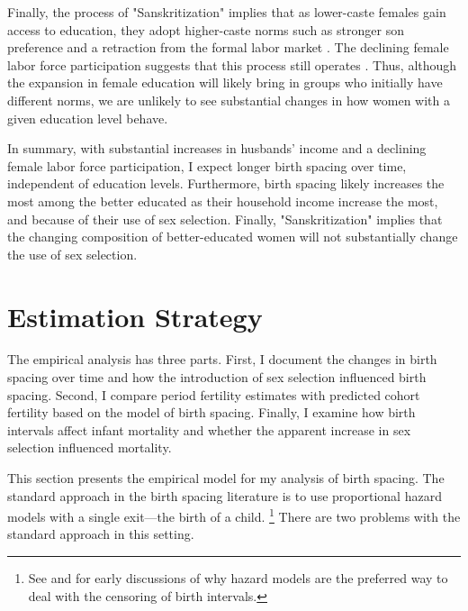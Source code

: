 \documentclass[12pt,letterpaper]{article}
\begin{document}
Finally, the process of "Sanskritization" implies that as lower-caste females gain access
to education, they adopt higher-caste norms such as stronger son preference and a
retraction from the formal labor market \citep{Srinivas1956}. 
The declining female labor force participation suggests that this process still 
operates \citep{Abraham2013,Chatterjee2018}.
Thus, although the expansion in female education will likely bring in groups who initially 
have different norms, we are unlikely to see substantial changes in how women with a given 
education level behave.

In summary, with substantial increases in husbands' income and a declining female labor 
force participation, I expect longer birth spacing over time, independent of education 
levels.
Furthermore, birth spacing likely increases the most among the better educated as their
household income increase the most, and because of their use of sex selection. 
Finally, "Sanskritization" implies that the changing composition of better-educated
women will not substantially change the use of sex selection.


\section{Estimation Strategy\label{sec:strategy}}


The empirical analysis has three parts. 
First, I document the changes in birth spacing over time and how the introduction of sex 
selection influenced birth spacing. 
Second, I compare period fertility estimates with predicted cohort fertility based on the 
model of birth spacing. 
Finally, I examine how birth intervals affect infant mortality and whether the apparent 
increase in sex selection influenced mortality. 

This section presents the empirical model for my analysis of birth spacing. 
The standard approach in the birth spacing literature is to use proportional hazard
models with a single exit---the birth of a child.%
\footnote{
See \citet{Sheps1970} and \citet{Newman1984} for early discussions of why 
hazard models are the preferred way to deal with the censoring of birth
intervals.
}
There are two problems with the standard approach in this setting.
\end{document}
